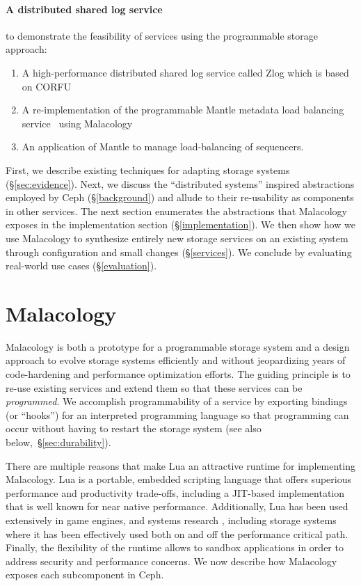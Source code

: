 \documentclass[10pt,twocolumn]{article}
\begin{document}
\paragraph*{A distributed shared log service} to demonstrate the feasibility of services using the programmable storage approach:

  \begin{enumerate}
  \item
    A high-performance distributed shared log service called Zlog which is based on CORFU~\cite{balakrishnan_corfu_2012}
  \item
    A re-implementation of the programmable Mantle metadata load balancing service~\cite{sevilla:sc15-mantle} using Malacology
  \item 
    An application of Mantle to manage load-balancing of sequencers.
  \end{enumerate}

First, we describe existing techniques for adapting storage systems
(\S\ref{sec:evidence}). Next, we discuss the ``distributed systems'' inspired
abstractions employed by Ceph (\S\ref{background}) and allude to their
re-usability as components in other services. The next section
enumerates the abstractions that Malacology exposes in the
implementation section (\S\ref{implementation}). We then show how we use
Malacology to synthesize entirely new storage services on an existing
system through configuration and small changes (\S\ref{services}). We
conclude by evaluating real-world use cases (\S\ref{evaluation}).

\section{Malacology}
\label{sec:malacology}

Malacology is both a prototype for a programmable storage system and a design approach to evolve storage systems efficiently and without
jeopardizing years of code-hardening and performance optimization
efforts. The guiding principle is to re-use existing services and extend them so that these services can be \emph{programmed}. We accomplish programmability of a service by exporting bindings (or ``hooks'') for an interpreted programming language so that programming can occur without having to restart the storage system (see also below,~\S\ref{sec:durability}). 

There are multiple reasons that make Lua an attractive runtime for implementing 
Malacology. Lua is a portable, embedded
scripting language that offers superious performance and productivity
trade-offs, including a JIT-based implementation that is well known for near
native performance. Additionally, Lua has been used extensively in game engines, 
and systems research \cite{neto:dls14-luaos}, including storage systems where it 
has been effectively used both on
\cite{grawinkel:pdsw2012-lua,watkins2013:bdmc13-in-vivo,geambasu_comet_2010} and 
off
\cite{sevilla:sc15-mantle} the performance critical path. Finally, the 
flexibility of the runtime allows to sandbox applications in order to address 
security and performance concerns. We now describe how Malacology exposes each 
subcomponent in Ceph.
\end{document}
